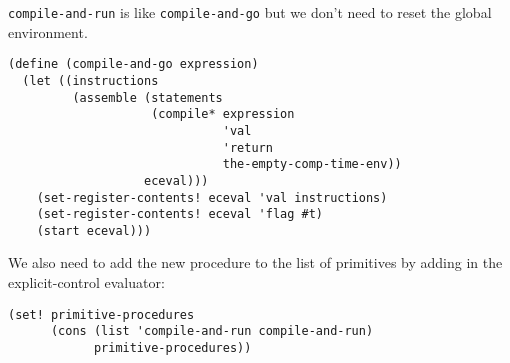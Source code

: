\documentclass[a4paper,12pt]{article}
\begin{document}
\lstinline!compile-and-run! is like \lstinline!compile-and-go! but we
don't need to reset the global environment.

\begin{lstlisting}
(define (compile-and-go expression)
  (let ((instructions
         (assemble (statements
                    (compile* expression
                              'val
                              'return
                              the-empty-comp-time-env))
                   eceval)))
    (set-register-contents! eceval 'val instructions)
    (set-register-contents! eceval 'flag #t)
    (start eceval)))
\end{lstlisting}

We also need to add the new procedure to the list of primitives by
adding in the explicit-control evaluator:

\begin{lstlisting}
(set! primitive-procedures
      (cons (list 'compile-and-run compile-and-run)
            primitive-procedures))
\end{lstlisting}
\end{document}
